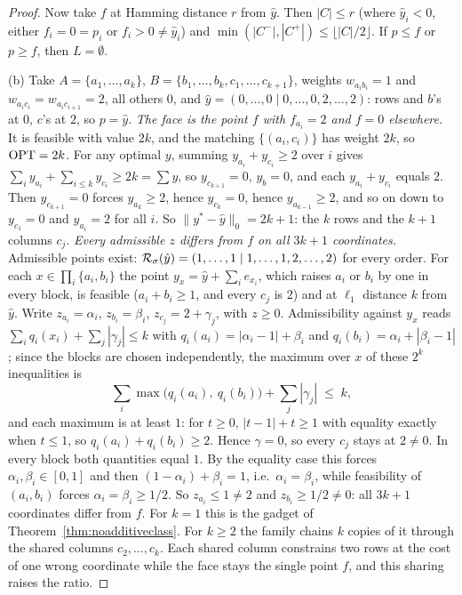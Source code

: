 \begin{proof}
Now take $f$ at Hamming distance
$r$ from $\hat y$. Then $|C| \le r$ (where $\hat y_i < 0$, either $f_i = 0 = p_i$ or $f_i > 0 \ne \hat y_i$)
and $\min(|C^-|,|C^+|) \le \lfloor |C|/2 \rfloor$. If $p \le f$ or $p \ge f$, then $L = \emptyset$.

(b) Take $A = \{a_1, \dots, a_k\}$, $B = \{b_1, \dots, b_k, c_1, \dots, c_{k+1}\}$, weights
$w_{a_i b_i} = 1$ and $w_{a_i c_i} = w_{a_i c_{i+1}} = 2$, all others $0$, and
$\hat y = (0, \dots, 0 \mid 0, \dots, 0, 2, \dots, 2)$: rows and $b$'s at $0$, $c$'s at $2$, so
$p = \hat y$. \emph{The face is the point $f$ with $f_{a_i} = 2$ and $f = 0$ elsewhere.} It is
feasible with value $2k$, and the matching $\{(a_i, c_i)\}$ has weight $2k$, so $\mathrm{OPT} = 2k$. For any
optimal $y$, summing $y_{a_i} + y_{c_i} \ge 2$ over $i$ gives
$\sum_i y_{a_i} + \sum_{i \le k} y_{c_i} \ge 2k = \sum y$, so $y_{c_{k+1}} = 0$, $y_b = 0$, and each
$y_{a_i} + y_{c_i}$ equals $2$. Then $y_{c_{k+1}} = 0$ forces $y_{a_k} \ge 2$, hence $y_{c_k} = 0$,
hence $y_{a_{k-1}} \ge 2$, and so on down to $y_{c_1} = 0$ and $y_{a_i} = 2$ for all $i$. So
$\|y^* - \hat y\|_0 = 2k+1$: the $k$ rows and the $k+1$ columns $c_j$.
\emph{Every admissible $z$ differs from $f$ on all $3k+1$ coordinates.} Admissible points exist:
$\mathcal{R}_\sigma(\hat y) = (1, \dots, 1 \mid 1, \dots, 1, 2, \dots, 2)$ for every order. For each
$x \in \prod_i \{a_i, b_i\}$ the point $y_x = \hat y + \sum_i e_{x_i}$, which raises $a_i$ or $b_i$
by one in every block, is feasible ($a_i + b_i \ge 1$, and every $c_j$ is $2$) and at $\ell_1$
distance $k$ from $\hat y$. Write $z_{a_i} = \alpha_i$, $z_{b_i} = \beta_i$, $z_{c_j} = 2 + \gamma_j$,
with $z \ge 0$. Admissibility against $y_x$ reads $\sum_i q_i(x_i) + \sum_j |\gamma_j| \le k$ with
$q_i(a_i) = |\alpha_i - 1| + \beta_i$ and $q_i(b_i) = \alpha_i + |\beta_i - 1|$; since the blocks are
chosen independently, the maximum over $x$ of these $2^k$ inequalities is
\[
  \sum_i \max\bigl(q_i(a_i),\ q_i(b_i)\bigr) + \sum_j |\gamma_j| \;\le\; k ,
\]
and each maximum is at least $1$: for $t \ge 0$, $|t - 1| + t \ge 1$ with equality exactly when
$t \le 1$, so $q_i(a_i) + q_i(b_i) \ge 2$. Hence $\gamma = 0$, so every $c_j$ stays at $2 \ne 0$. In
every block both quantities equal $1$. By the equality case this forces
$\alpha_i, \beta_i \in [0, 1]$ and then $(1 - \alpha_i) + \beta_i = 1$, i.e.\ $\alpha_i = \beta_i$,
while feasibility of $(a_i, b_i)$ forces $\alpha_i = \beta_i \ge 1/2$. So $z_{a_i} \le 1 \ne 2$ and
$z_{b_i} \ge 1/2 \ne 0$: all $3k+1$ coordinates differ from $f$. For $k = 1$ this is the gadget of
Theorem~\ref{thm:noadditiveclass}. For $k \ge 2$ the family chains $k$ copies of it through the
shared columns $c_2, \dots, c_k$. Each shared column constrains two rows at the cost of one wrong
coordinate while the face stays the single point $f$, and this sharing raises the ratio.
\end{proof}

